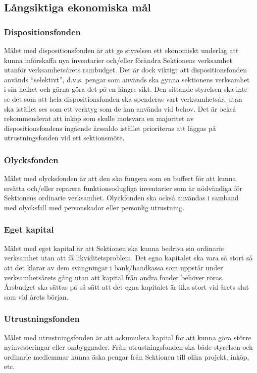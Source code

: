 \documentclass[10pt]{article}
\begin{document}
\newpage
\subsection*{Långsiktiga ekonomiska mål}

\subsubsection*{Dispositionsfonden}
Målet med dispositionsfonden är att ge styrelsen ett ekonomiskt underlag att kunna införskaffa nya inventarier och/eller förändra Sektionens verksamhet utanför verksamhetsårets rambudget. Det är dock viktigt att dispositionsfonden används “selektivt”, d.v.s. pengar som används ska gynna sektionens verksamhet i sin helhet och gärna göra det på en längre sikt. Den sittande styrelsen ska inte se det som att hela dispositionsfonden ska spenderas vart verksamhetsår, utan ska istället ses som ett verktyg som de kan använda vid behov. Det är också rekommenderat att inköp som skulle motsvara en majoritet av dispositionsfondens ingående årssaldo istället prioriteras att läggas på utrustningsfonden vid ett sektionsmöte.

\subsubsection*{Olycksfonden}
Målet med olycksfonden är att den ska fungera som en buffert för att kunna ersätta och/eller reparera funktionsodugliga inventarier som är nödvändiga för Sektionens ordinarie verksamhet.  Olyckfonden ska också användas i samband med olycksfall med personskador eller personlig utrustning.

\subsubsection*{Eget kapital}
Målet med eget kapital är att Sektionen ska kunna bedriva sin ordinarie verksamhet utan att få likviditetsproblem. Det egna kapitalet ska vara så stort så att det klarar av dem svängningar i bank/handkassa som uppstår under verksamhetsårets gång utan att kapital från andra fonder behöver röras. Årsbudget ska sättas på så sätt att det egna kapitalet är lika stort vid årets slut som vid årets början.

\subsubsection*{Utrustningsfonden}
Målet med utrustningsfonden är att ackumulera kapital för att kunna göra större nyinvesteringar eller ombyggnader. Från utrustningsfonden ska både styrelsen och ordinarie medlemmar kunna äska pengar från Sektionen till olika projekt, inköp, etc.
\end{document}
